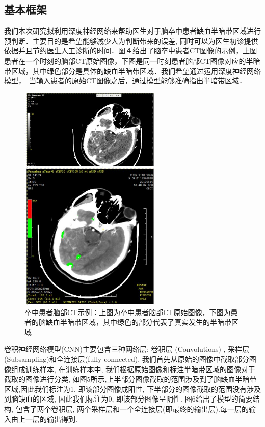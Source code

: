 \documentclass[12pt]{article}
\begin{document}
\begin{CJK*}{UTF8}{gbsn}
\subsection{基本框架}
我们本次研究拟利用深度神经网络来帮助医生对于脑卒中患者缺血半暗带区域进行预判断．主要目的是希望能够减少人为判断带来的误差, 同时可以为医生初诊提供依据并且节约医生人工诊断的时间．图４给出了脑卒中患者CT图像的示例，上图患者在一个时刻的脑部CT原始图像，下图是同一时刻患者脑部CT图像对应的半暗带区域，其中绿色部分是具体的缺血半暗带区域．我们希望通过运用深度神经网络模型，　当输入患者的原始CT图像之后，通过模型能够准确指出半暗带区域．　
\begin{figure}[H]
\centering
\includegraphics[width=0.6\textwidth]{ct_chart.png}
\caption{卒中患者脑部CT示例：上图为卒中患者脑部CT原始图像，下图为患者的脑缺血半暗带区域，其中绿色的部分代表了真实发生的半暗带区域}
\label{fig:fig1}
\end{figure}

卷积神经网络模型(CNN)主要包含三种网络层: 卷积层 (Convolutions) , 采样层(Subsampling)和全连接层(fully connected). 我们首先从原始的图像中截取部分图像组成训练样本, 在训练样本中, 我们根据原始图像和标注半暗带区域的图像对于截取的图像进行分类, 如图5所示,上半部分图像截取的范围涉及到了脑缺血半暗带区域,因此我们标注为1, 即该部分图像成阳性, 下半部分的图像截取的范围没有涉及到脑缺血的区域, 因此我们标注为0, 即该部分图像呈阴性. 图6给出了模型的简要结构, 包含了两个卷积层, 两个采样层和一个全连接层(即最终的输出层).每一层的输入由上一层的输出得到. 


\end{CJK*}
\end{document}
